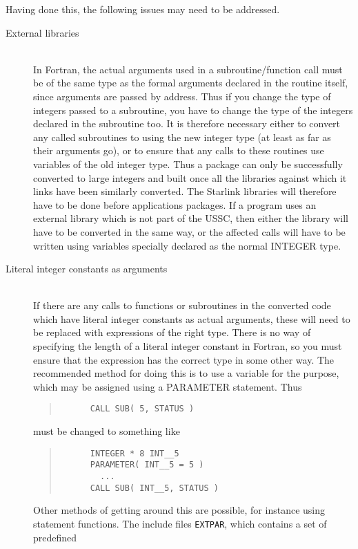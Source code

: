 \documentclass[twoside,11pt]{article}
\newcommand{\html}[1]{}
\renewcommand{\_}{\texttt{\symbol{95}}}
\newcommand{\file}[1]{{\tt #1}}
\newcommand{\ditem}[1]{\item[#1]\mbox{}\\}
\newenvironment{squote}{\begin{quote}\begin{small}}{\end{small}\end{quote}}
\begin{document}
Having done this, the following issues may need to be addressed.
\begin{description}
%
\ditem{External libraries}
In Fortran, the actual arguments used in a subroutine/function
call must be of the same type as the formal arguments declared
in the routine itself, since arguments are passed by address.
Thus if you change the type of integers passed to a subroutine,
you have to change the type of the integers declared in the subroutine too.
It is therefore necessary either to convert any called subroutines
to using the new integer type (at least as far as their arguments go), 
or to ensure that any calls to these routines use variables of 
the old integer type.
Thus a package can only be successfully converted to large integers
and built once all the libraries against which it links have been 
similarly converted.  The Starlink libraries will therefore have to
be done before applications packages.
If a program uses an external library which is not part of the USSC,
then either the library will have to be converted in the same way,
or the affected calls will have to be written using 
variables specially declared as the normal INTEGER type.
\html{\begin{squote}\end{squote}}
%
\ditem{Literal integer constants as arguments}
If there are any calls to functions or subroutines in the converted 
code which have literal integer constants as actual arguments,
these will need to be replaced with expressions of the right type.
There is no way of specifying the length of a literal integer constant
in Fortran, so you must ensure that the expression has the correct type
in some other way.
The recommended method for doing this is to use a variable for the
purpose, which may be assigned using a PARAMETER statement.
Thus
\begin{squote}
\begin{verbatim}
      CALL SUB( 5, STATUS )
\end{verbatim}
\end{squote}
must be changed to something like
\begin{squote}
\begin{verbatim}
      INTEGER * 8 INT__5
      PARAMETER( INT__5 = 5 )
        ...
      CALL SUB( INT__5, STATUS )
\end{verbatim}
\end{squote}
Other methods of getting around this are possible,
for instance using statement functions.
The include files \file{EXT\_PAR}, which contains a set of predefined

\end{description}
\end{document}

